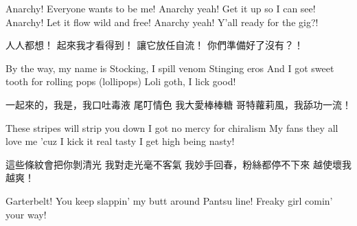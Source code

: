 \begin{paracol}{2}
        \vspace{3em}
        \switchcolumn*

        Anarchy! Everyone wants to be me!
        Anarchy yeah! Get it up so I can see!
        Anarchy! Let it flow wild and free!
        Anarchy yeah! Y'all ready for the gig?!
        \vspace{3em}

        \switchcolumn
        人人都想！
        起來我才看得到！
        讓它放任自流！
        你們準備好了沒有？！


        \vspace{3em}
        \switchcolumn*

        By the way, my name is Stocking, I spill venom
        Stinging eros
        And I got sweet tooth for rolling pops (lollipops)
        Loli goth, I lick good!

        \vspace{3em}

        \switchcolumn
        一起來的，我是，我口吐毒液
        尾叮情色
        我大愛棒棒糖
        哥特蘿莉風，我舔功一流！

        \vspace{3em}
        \switchcolumn*

        These stripes will strip you down
        I got no mercy for chiralism
        My fans they all love me 'cuz I kick it real tasty
        I get high being nasty!

        \vspace{3em}

        \switchcolumn
        這些條紋會把你剝清光
        我對走光毫不客氣
        我妙手回春，粉絲都停不下來
        越使壞我越爽！

        \vspace{3em}
        \switchcolumn*

        Garterbelt! You keep slappin' my butt around
        Pantsu line! Freaky girl comin' your way!

        \vspace{3em}


\end{paracol}
